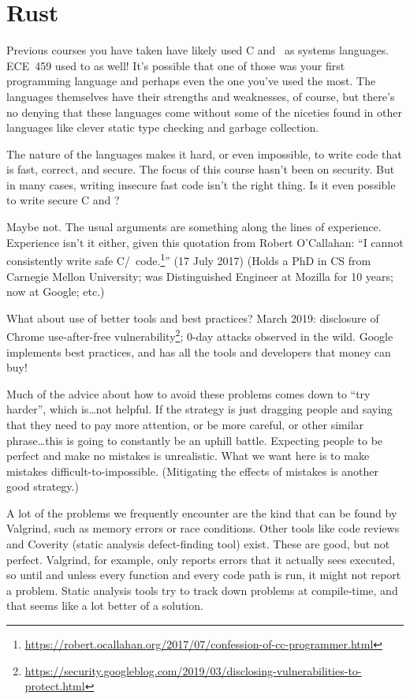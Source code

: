 \section*{Rust}

Previous courses you have taken have likely used C and \CPP~as systems languages. ECE~459 used to as well! It's possible that one of those was your first programming language and perhaps even the one you've used the most. The languages themselves have their strengths and weaknesses, of course, but there's no denying that these languages come without some of the niceties found in other languages like clever static type checking and garbage collection.

The nature of the languages makes it hard, or even impossible, to write code that is fast, correct, and secure. The focus of this course hasn't been on security. But in many cases, writing insecure fast code isn't the right thing. Is it even possible to write secure C and \CPP?

Maybe not. The usual arguments are something along the lines of experience. Experience isn't it either, given this quotation from Robert O'Callahan: ``I cannot consistently write safe C/\CPP~code.\footnote{\url{https://robert.ocallahan.org/2017/07/confession-of-cc-programmer.html}}'' (17 July 2017) (Holds a PhD in CS from Carnegie Mellon University; was Distinguished Engineer at Mozilla for 10 years; now at Google; etc.)

What about use of better tools and best practices? March 2019: disclosure of Chrome use-after-free vulnerability\footnote{\url{https://security.googleblog.com/2019/03/disclosing-vulnerabilities-to-protect.html}}; 0-day attacks
observed in the wild. Google implements best practices, and has all the tools and developers that
money can buy!

Much of the advice about how to avoid these problems comes down to ``try harder'', which is\ldots not helpful. If the strategy is just dragging people and saying that they need to pay more attention, or be more careful, or other similar phrase\ldots this is going to constantly be an uphill battle. Expecting people to be perfect and make no mistakes is unrealistic. What we want here is to make mistakes difficult-to-impossible. (Mitigating the effects of mistakes is another good strategy.)

A lot of the problems we frequently encounter are the kind that can be found by Valgrind, such as memory errors or race conditions. Other tools like code reviews and Coverity (static analysis defect-finding tool) exist. These are good, but not perfect. Valgrind, for example, only reports errors that it actually sees executed, so until and unless every function and every code path is run, it might not report a problem. Static analysis tools try to track down problems at compile-time, and that seems like a lot better of a solution.

